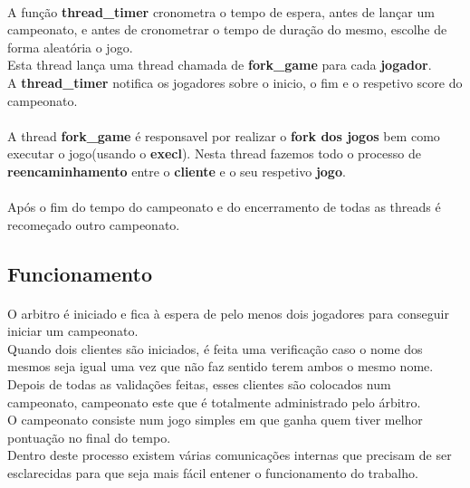 \documentclass[letterpaper, 11pt]{article}
\begin{document}
\paragraph{}
A função \textbf{thread\_timer} cronometra o tempo de espera, antes de lançar um campeonato, e antes de cronometrar o tempo de duração do mesmo, escolhe de forma aleatória o jogo.\\
Esta thread lança uma thread chamada de \textbf{fork\_game} para cada \textbf{jogador}.\\
A \textbf{thread\_timer} notifica os jogadores sobre o inicio, o fim e o respetivo score do campeonato.
\paragraph{}
A thread \textbf{fork\_game} é responsavel por realizar o \textbf{fork dos jogos} bem como executar o jogo(usando o \textbf{execl}). Nesta thread fazemos todo o processo de \textbf{reencaminhamento} entre o \textbf{cliente} e o seu respetivo \textbf{jogo}.
\paragraph{}
Após o fim do tempo do campeonato e do encerramento de todas as threads é recomeçado outro campeonato. 

\subsection{Funcionamento}
\label{sec:orgb6c9eae}

\paragraph{}
O arbitro é iniciado e fica à espera de pelo menos dois jogadores para conseguir iniciar um campeonato.\\
Quando dois clientes são iniciados, é feita uma verificação caso o nome dos mesmos seja igual uma vez que não faz sentido terem ambos o mesmo nome.\\
Depois de todas as validações feitas, esses clientes são colocados num campeonato, campeonato este que é totalmente administrado pelo árbitro.\\
O campeonato consiste num jogo simples em que ganha quem tiver melhor pontuação no final do tempo.\\
Dentro deste processo existem várias comunicações internas que precisam de ser esclarecidas para que seja mais fácil entener o funcionamento do trabalho.
\end{document}
